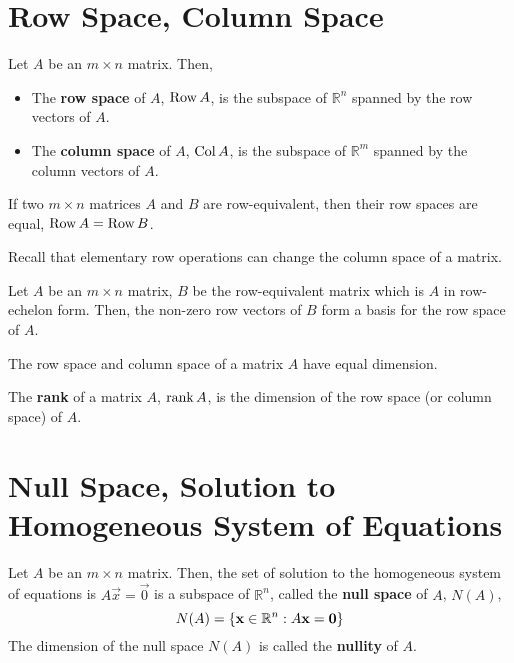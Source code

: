 \documentclass[letterpaper,12pt]{article}
\begin{document}
\section*{Row Space, Column Space}

\begin{definition}
Let $A$ be an $m \times n$ matrix. Then,
\begin{itemize}
    \item The \textbf{row space} of $A$, $\operatorname{Row}{A}$, is the subspace of $\mathbb{R}^n$ spanned by the row vectors of $A$.
    \item The \textbf{column space} of $A$, $\operatorname{Col}{A}$, is the subspace of $\mathbb{R}^m$ spanned by the column vectors of $A$.
\end{itemize}
\end{definition}

\begin{theorem}
If two $m \times n$ matrices $A$ and $B$ are row-equivalent, then their row spaces are equal, $\operatorname{Row}{A} = \operatorname{Row}{B}$.
\end{theorem}

Recall that elementary row operations can change the column space of a matrix.

\begin{theorem}
Let $A$ be an $m \times n$ matrix, $B$ be the row-equivalent matrix which is $A$ in row-echelon form. Then, the non-zero row vectors of $B$ form a basis for the row space of $A$.
\end{theorem}

\begin{theorem}
The row space and column space of a matrix $A$ have equal dimension.
\end{theorem}

\begin{definition}
The \textbf{rank} of a matrix $A$, $\operatorname{rank}{A}$, is the dimension of the row space (or column space) of $A$.
\end{definition}

\section*{Null Space, Solution to Homogeneous System of Equations}
\begin{theorem}
Let $A$ be an $m \times n$ matrix. Then, the set of solution to the homogeneous system of equations is $A \vec{x} = \vec{0}$ is a subspace of $\mathbb{R}^n$, called the \textbf{null space} of $A$, $N(A)$,
\begin{equation*}
    N(A) = \left\{ \mathbf{x} \in \mathbb{R}^n: A \mathbf{x} = \mathbf{0} \right\}
\end{equation*}
The dimension of the null space $N(A)$ is called the \textbf{nullity} of $A$.
\end{theorem}
\end{document}

